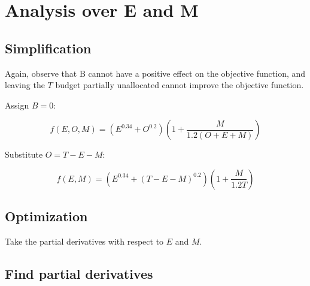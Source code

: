 \documentclass{article}
\begin{document}
\begin{comment}
Substitute $k = \left(\frac{0.2}{0.34}\right)^{1.25}$:
\begin{equation}\label{eq:dfde0r4}
  \begin{split}
  0 & = \frac{4301}{150}E^{-0.66} - \frac{170\left(\frac{0.2}{0.34}\right)^{1.25} + 5\left(\frac{0.2}{0.34}\right)^{0.25}}{6T}E^{0.165} - \frac{175}{6T}E^{0.34} \\
    & = \frac{4301}{150}E^{-0.66} - \frac{170\left(\frac{0.2}{0.34}\right)^{1.25} + 5\left(\frac{0.2}{0.34}\right)^{0.25}}{6T}E^{0.165} - \frac{175}{6T}E^{0.34} \\
  \end{split}
\end{equation}
\end{comment}


\section{Analysis over E and M}

\subsection{Simplification}

Again, observe that B cannot have a positive effect on the objective function, and leaving the $T$ budget partially unallocated cannot improve the objective function.

Assign $B = 0$:

\[
f(E, O, M) = \left( E^{0.34} + O^{0.2} \right) \left( 1 + \frac{M}{1.2 \left( O + E + M \right)} \right)
\]

Substitute $O = T - E - M$:

\[
f(E, M) = \left( E^{0.34} + \left( T - E - M \right)^{0.2} \right) \left( 1 + \frac{M}{1.2 T} \right)
\]

\subsection{Optimization}

Take the partial derivatives with respect to $E$ and $M$.

\subsection{Find partial derivatives}
\end{document}
